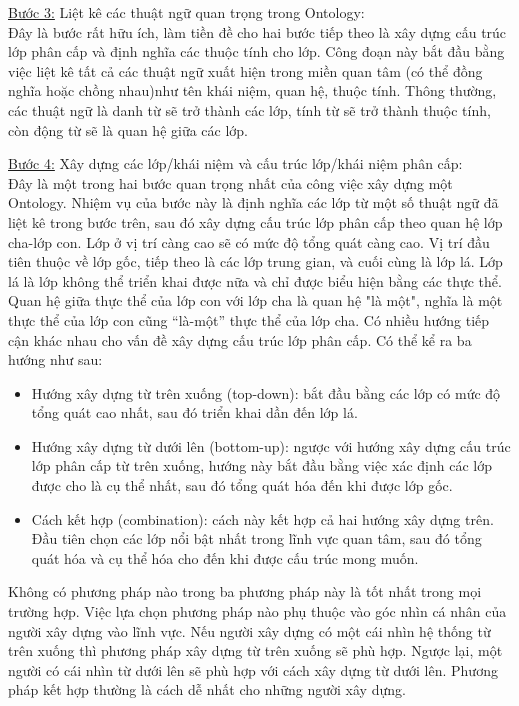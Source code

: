 \underline{Bước 3:} Liệt kê các thuật ngữ quan trọng trong Ontology:\\
Đây là bước rất hữu ích, làm tiền đề cho hai bước tiếp theo là xây dựng cấu trúc lớp phân cấp và định nghĩa các thuộc tính cho lớp. Công đoạn này bắt đầu bằng việc liệt kê tất cả các thuật ngữ xuất hiện trong miền quan tâm (có thể đồng nghĩa hoặc chồng nhau)như tên khái niệm, quan hệ, thuộc tính. Thông thường, các thuật ngữ là danh từ sẽ trở thành các lớp, tính từ sẽ trở thành thuộc tính, còn động từ sẽ là quan hệ giữa các lớp. 

\underline{Bước 4:} Xây dựng các lớp/khái niệm và cấu trúc lớp/khái niệm phân cấp:\\
Đây là một trong hai bước quan trọng nhất của công việc xây dựng một Ontology. Nhiệm vụ của bước này là định nghĩa các lớp từ một số thuật ngữ đã liệt kê trong bước trên, sau đó xây dựng cấu trúc lớp phân cấp theo quan hệ lớp cha-lớp con. Lớp ở vị trí càng cao sẽ có mức độ tổng quát càng cao. Vị trí đầu tiên thuộc về lớp gốc, tiếp theo là các lớp trung gian, và cuối cùng là lớp lá. Lớp lá là lớp không thể triển khai được nữa và chỉ được biểu hiện bằng các thực thể. Quan hệ giữa thực thể của lớp con với lớp cha là quan hệ "là một", nghĩa là một thực thể của lớp con cũng “là-một” thực thể của lớp cha. Có nhiều hướng tiếp cận khác nhau cho vấn đề xây dựng cấu trúc lớp phân cấp. Có thể kể ra ba hướng như sau: 
\begin{itemize}
	\item Hướng xây dựng từ trên xuống (top-down): bắt đầu bằng các lớp có mức độ tổng quát cao nhất, sau đó triển khai dần đến lớp lá.
	\item Hướng xây dựng từ dưới lên (bottom-up): ngược với hướng xây dựng cấu trúc lớp phân cấp từ trên xuống, hướng này bắt đầu bằng việc xác định các lớp được cho là cụ thể nhất, sau đó tổng quát hóa đến khi được lớp gốc.
	\item Cách kết hợp (combination): cách này kết hợp cả hai hướng xây dựng trên. Đầu tiên chọn các lớp nổi bật nhất trong lĩnh vực quan tâm, sau đó tổng quát hóa và cụ thể hóa cho đến khi được cấu trúc mong muốn.
\end{itemize}

Không có phương pháp nào trong ba phương pháp này là tốt nhất trong mọi trường hợp. Việc lựa chọn phương pháp nào phụ thuộc vào góc nhìn cá nhân của người xây dựng vào lĩnh vực. Nếu người xây dựng có một cái nhìn hệ thống từ trên xuống thì phương pháp xây dựng từ trên xuống sẽ phù hợp. Ngược lại, một người có cái nhìn từ dưới lên sẽ phù hợp với cách xây dựng từ dưới lên. Phương pháp kết hợp thường là cách dễ nhất cho những người xây dựng. 

